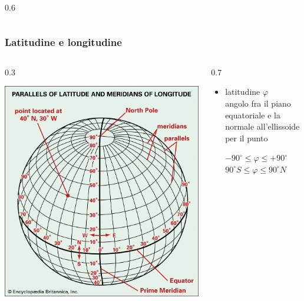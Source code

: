 \documentclass{beamer}
\begin{document}
{\begin{frame}
\begin{columns}
\begin{column} {0.6\textwidth}
      \end{column}
  \end{columns}

\end{frame}

\begin{frame}
   \frametitle{Latitudine e longitudine}	
	
   \begin{columns}	
          \begin{column} {0.3\textwidth}
          \begin{center}
              \includegraphics[width=\textwidth] {./pics_2022_03/meridiani_e_paralleli.png}	
          \end{center}
          
      \end{column}
      \begin{column} {0.7\textwidth}
      
          \begin{itemize}
      		\item latitudine $ \varphi $ \\
            {\scriptsize angolo fra il piano equatoriale e  la normale all'ellissoide per il punto}
      		\begin{center}
      		 $ -90^{\circ} \leq \varphi \leq +90^{\circ} $ \\
             $ 90^{\circ} S \leq  \varphi \leq 90^{\circ} N $ \\
             

\end{center}
\end{itemize}
\end{column}
\end{columns}
\end{frame}}
\end{document}
